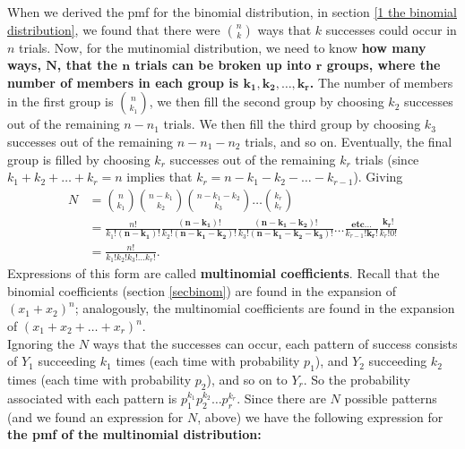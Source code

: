 \noindent When we derived the pmf for the binomial distribution, in section \ref{1 the binomial distribution}, we found that there were $\binom{n}{k}$ ways that $k$ successes could occur in $n$ trials. Now, for the mutinomial distribution, we need to know \textbf{how many ways, $\boldsymbol{N}$, that the $\boldsymbol{n}$ trials can be broken up into $\boldsymbol{r}$ groups, where the number of members in each group is $\boldsymbol{k_1,k_2,\ldots,k_r}$.} The number of members in the first group is $\binom{n}{k_1}$, we then fill the second group by choosing $k_2$ successes out of the remaining $n - n_1$ trials. We then fill the third group by choosing $k_3$ successes out of the remaining $n - n_1 - n_2$ trials, and so on. Eventually, the final group is filled by choosing $k_r$ successes out of the remaining $k_r$ trials (since $k_1 + k_2 + \ldots + k_r = n$ implies that $k_r = n - k_1 - k_2 - \ldots - k_{r-1}$). Giving
\begin{align*}
N     & = \binom{n}{k_1}\binom{n-k_1}{k_2}\binom{n-k_1-k_2}{k_3}\ldots\binom{k_r}{k_r} \\
        & = \frac{n!}{k_1!\boldsymbol{(n-k_1)!}}\frac{\boldsymbol{(n-k_1)!}}{k_2!\boldsymbol{(n-k_1-k_2)!}}\frac{\boldsymbol{(n-k_1-k_2)!}}{k_3!\boldsymbol{(n-k_1-k_2-k_3)!}}\ldots\frac{\textbf{etc...}}{k_{r-1}!\boldsymbol{k_r!}}\frac{\boldsymbol{k_r!}}{k_r!0!} \\
        & = \frac{n!}{k_1!k_2!k_3!\ldots k_r!}. \tag{cancelling terms in bold}
\end{align*}
Expressions of this form are called \textbf{multinomial coefficients}. Recall that the binomial coefficients (section \ref{secbinom}) are found in the expansion of $(x_1 + x_2)^n$; analogously, the multinomial coefficients are found in the expansion of $(x_1 + x_2 + \ldots + x_r)^n$. \\

\noindent Ignoring the $N$ ways that the successes can occur, each pattern of success consists of $Y_1$ succeeding $k_1$ times (each time with probability $p_1$), and $Y_2$ succeeding $k_2$ times (each time with probability $p_2$), and so on to $Y_r$. So the probability associated with each pattern is $p_1^{k_1}p_2^{k_2}\ldots p_r^{k_r}$. Since there are $N$ possible patterns (and we found an expression for $N$, above) we have the following expression for \textbf{the pmf of the multinomial distribution:}

  	\bigskip
	
	\hfil{}
	\bigskip
	
